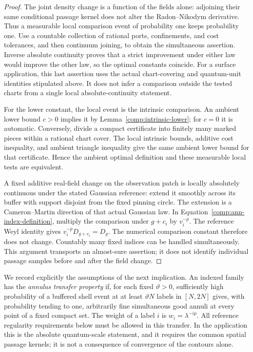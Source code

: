 \begin{proof}
The joint density change is a function of the fields alone:
adjoining their same conditional passage kernel does not alter the
Radon--Nikodym derivative.  Thus a measurable local comparison event
of probability one keeps probability one.  Use a countable collection
of rational ports, confinements, and cost tolerances, and then continuum
joining, to obtain the simultaneous assertion.  Inverse absolute
continuity proves that a strict improvement under either law would
improve the other law, so the optimal constants coincide.
For a surface application, this last assertion uses the actual
chart-covering and quantum-unit identities stipulated above.  It does
not infer a comparison outside the tested charts from a single local
absolute-continuity statement.

For the lower constant, the local event is the intrinsic comparison.
An ambient lower bound $c>0$ implies it by
Lemma~\ref{comp:intrinsic-lower}; for $c=0$ it is automatic.
Conversely, divide a compact certificate into finitely many marked
pieces within a rational chart cover.  The local intrinsic bounds,
additive cost inequality, and ambient triangle inequality give the
same ambient lower bound for that certificate.  Hence the ambient
optimal definition and these measurable local tests are equivalent.

A fixed additive real-field change on the observation patch is locally
absolutely continuous under the stated Gaussian reference: extend it
smoothly across its buffer with support disjoint from the fixed pinning
circle.  The extension is a Cameron--Martin direction of that actual
Gaussian law.  In
Equation~\eqref{comp:ann-index-definition}, multiply the comparison
under $g+c_i$ by $v_i^{-p}$.  The reference Weyl identity gives
$v_i^{-p}D_{g+c_i}=D_g$.  The numerical comparison constant therefore
does not change.  Countably many fixed indices can be handled
simultaneously.  This argument transports an almost-sure assertion;
it does not identify individual passage samples before and after
the field change.
\end{proof}

We record explicitly the assumptions of the next implication.  An indexed
family has the \emph{annulus transfer property} if, for each fixed
$\vartheta>0$, sufficiently high probability of a buffered shell event
at at least $\vartheta N$ labels in $[N,2N]$ gives, with probability tending
to one, arbitrarily fine simultaneous good annuli at every point of a
fixed compact set.  The weight of a label $i$ is $w_i=\lambda^{-ip}$.
All reference regularity requirements below must be allowed in this
transfer.  In the application this is the absolute quantum-scale statement,
and it requires the common spatial passage kernels; it is not a
consequence of convergence of the contours alone.

